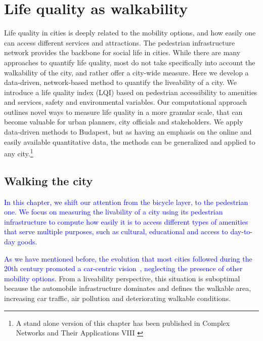 \chapter{Life quality as walkability}\label{ch:LQI}

Life quality in cities is deeply related to the mobility options, and how easily one can access different services and attractions. The pedestrian infrastructure network provides the backbone for social life in cities. While there are many approaches to quantify life quality, most do not take specifically into account the walkability of the city, and rather offer a city-wide measure. Here we develop a data-driven, network-based method to quantify the liveability of a city. We introduce a life quality index (LQI) based on pedestrian accessibility to amenities and services, safety and environmental variables. Our computational approach outlines novel ways to measure life quality in a more granular scale, that can become valuable for urban planners, city officials and stakeholders. We apply data-driven methods to Budapest, but as having an emphasis on the online and easily available quantitative data, the methods can be generalized and applied to any city.\footnote{A stand alone version of this chapter has been published in Complex Networks and Their Applications VIII \cite{natera2020walkability}}
\pagebreak

\section{Walking the city}
\textcolor{blue}{In this chapter, we shift our attention from the bicycle layer, to the pedestrian one. We focus on measuring the livability of a city using its pedestrian infrastructure to compute how easily it is to access different types of amenities that serve multiple purposes, such as cultural, educational and access to day-to-day goods.}

\textcolor{blue}{As we have mentioned before, the evolution that most cities followed during the 20th century promoted a car-centric vision~\cite{Jacobs1961Death,Gossling2016Space,Szell2018Crowdsourced}, neglecting the presence of other mobility options.} From a liveability perspective, this situation is suboptimal because the automobile infrastructure dominates and defines the walkable area, increasing car traffic, air pollution and deteriorating walkable conditions.

